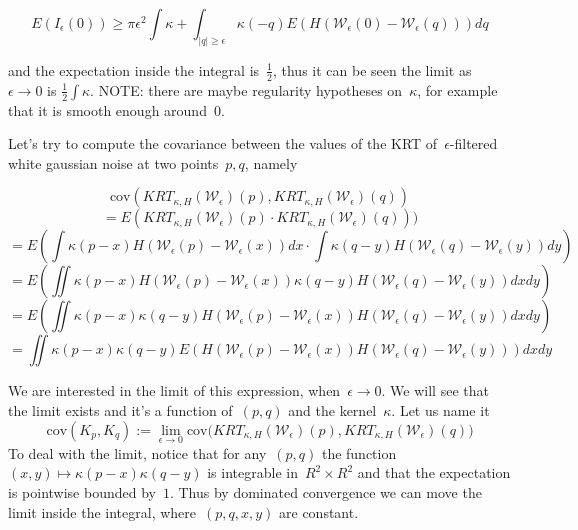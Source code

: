 \documentclass[12pt]{article}                  %
\begin{document}
$$
E(I_\epsilon(0))
\geq
\pi\epsilon^2\int\kappa +
\int_{|q|\geq\epsilon}
\kappa(-q)E(H(
	\mathcal{W}_\epsilon(0)
	-
	\mathcal{W}_\epsilon(q)
))dq
$$

and the expectation inside the integral is~$\frac12$, thus it
can be seen the limit as~$\epsilon\to0$ is
$\frac12\int\kappa$.  NOTE: there are maybe regularity hypotheses on~$\kappa$, for
example that it is smooth enough around~$0$.

\bigskip

Let's try to compute the covariance between the values of the KRT
of~$\epsilon$-filtered white gaussian noise at two
points~$p,q$, namely

\[
	\mathrm{cov}(
		KRT_{\kappa,H}(\mathcal{W}_\epsilon)(p),
		KRT_{\kappa,H}(\mathcal{W}_\epsilon)(q)
	)
\]
\[
	= E(
		KRT_{\kappa,H}(\mathcal{W}_\epsilon)(p)\cdot
		KRT_{\kappa,H}(\mathcal{W}_\epsilon)(q)
	)
	)
\]
\[
	= E\left(
		\int\kappa(p-x)H(
			\mathcal{W}_\epsilon(p)
			-
			\mathcal{W}_\epsilon(x)
		)dx
		\cdot
		\int\kappa(q-y)H(
			\mathcal{W}_\epsilon(q)
			-
			\mathcal{W}_\epsilon(y)
		)dy
	\right)
\]
\[
	= E\left(
		\iint
		\kappa(p-x)H(
			\mathcal{W}_\epsilon(p)
			-
			\mathcal{W}_\epsilon(x)
		)
		\kappa(q-y)H(
			\mathcal{W}_\epsilon(q)
			-
			\mathcal{W}_\epsilon(y)
		)
		dx
		dy
	\right)
\]
\[
	= E\left(
		\iint
		\kappa(p-x)
		\kappa(q-y)
		H(
			\mathcal{W}_\epsilon(p)
			-
			\mathcal{W}_\epsilon(x)
		)
		H(
			\mathcal{W}_\epsilon(q)
			-
			\mathcal{W}_\epsilon(y)
		)
		dx
		dy
	\right)
\]
\[
	=
		\iint
		\kappa(p-x)
		\kappa(q-y)
	E\left(
		H(
			\mathcal{W}_\epsilon(p)
			-
			\mathcal{W}_\epsilon(x)
		)
		H(
			\mathcal{W}_\epsilon(q)
			-
			\mathcal{W}_\epsilon(y)
		)
	\right)
		dx
		dy
\]

We are interested in the limit of this expression,  when~$\epsilon\to 0$.
We will see that the limit exists and it's a function of~$(p,q)$ and the
kernel~$\kappa$.  Let us name it
\[
	\mathrm{cov}(K_p,K_q)
	:=
	\lim_{\epsilon\to0}
	\mathrm{cov}\bigl(
		KRT_{\kappa,H}(\mathcal{W}_\epsilon)(p),
		KRT_{\kappa,H}(\mathcal{W}_\epsilon)(q)
	\bigr)
\]
To deal with the limit, notice that for any~$(p,q)$ the
function~$(x,y)\mapsto\kappa(p-x)\kappa(q-y)$ is integrable in~$R^2\times
R^2$ and that the expectation is pointwise bounded by~$1$.  Thus by
dominated convergence we can move the limit inside the integral,
where~$(p,q,x,y)$ are constant.
\end{document}
